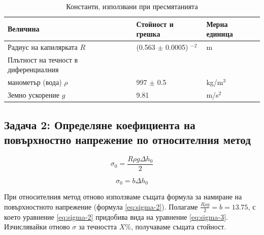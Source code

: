 \documentclass[12pt]{article}
\begin{document}
\begin{table}[h]
\begin{center}
\begin{tabular}{|l|l|l|} \hline
    Величина & Стойност и грешка & Мерна единица \\ \hline
    Радиус на капилярката $R$ & (0.563 $\pm$ 0.0005) \cdot 10$^{-2}$ & m \\ \hline
    Плътност на течност в диференциалния & & \\ 
    манометър (вода) $\rho$ & 997 $\pm$ 0.5 & kg/m$^3$ \\ \hline 
    Земно ускорение $g$ & 9.81 & m/s$^2$ \\ \hline
\end{tabular}
\caption{\label{tbl:constants}Константи, използвани при пресмятанията}
\end{center}
\end{table}

\subsection{Задача 2: Определяне коефициента на повърхностно напрежение по относителния метод}

\begin{equation}\label{eq:sigma-2}
    \sigma_0 = \frac{R\rho g \Delta h_0}{2}
\end{equation}

\begin{equation}\label{eq:sigma-3}
    \sigma_0 = b \Delta h_0
\end{equation}

При относителния метод отново използваме същата формула за намиране на повърхностното напрежение (формула \ref{eq:sigma-2}). Полагаме $\frac{R \rho g}{2} = b = 13.75 $, с което уравнение \ref{eq:sigma-2} придобива вида на уравнение \ref{eq:sigma-3}. Изчислявайки отново $\sigma$ за течността $X\%$, получаваме същата стойност.
\end{document}

